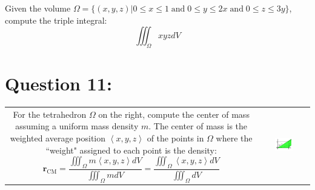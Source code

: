 \documentclass{article}
\newcommand{\rowvec}[3]{\left\langle #1, #2, #3 \right\rangle}
\begin{document}
Given the volume \(\Omega = \{(x,y,z)|0 \leq x \leq 1 \;\text{and}\; 0 \leq y \leq 2x \;\text{and}\; 0 \leq z \leq 3y\}\), compute the triple integral: 
\[\iiint_{\Omega} xyz dV\]



\section*{Question 11:}

\begin{tabular}{cc}
\parbox{0.6\textwidth}{For the tetrahedron \(\Omega\) on the right, compute the center of mass assuming a uniform mass density \(m\). The center of mass is the weighted average position \(\rowvec{x}{y}{z}\) of the points in \(\Omega\) where the ``weight" assigned to each point is the density: \[\mathbf{r}_{\text{CM}} = \frac{\iiint_{\Omega} m\rowvec{x}{y}{z}dV}{\iiint_{\Omega} mdV} = \frac{\iiint_{\Omega} \rowvec{x}{y}{z}dV}{\iiint_{\Omega} dV}\]} 
&
\parbox{0.4\textwidth}{\includegraphics[width = 0.4\textwidth]{Test_bench_part_3_images/Test_bench_part_3_image_4}}
\end{tabular}
\end{document}

